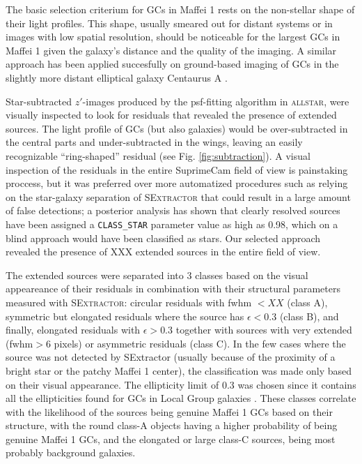 \documentclass[useAMS,usenatbib]{mn2e}
\begin{document}
The basic selection criterium for GCs in Maffei 1 rests on the
non-stellar shape of their light profiles. This shape, usually smeared
out for distant systems or in images with low spatial resolution,
should be noticeable for the largest GCs in Maffei 1 given the
galaxy's distance and the quality of the imaging. A similar approach
has been applied succesfully on ground-based imaging of GCs in the
slightly more distant elliptical galaxy Centaurus A
\citep{rejkuba01,gomez06,gomez07}.

Star-subtracted $z'$-images produced by the psf-fitting algorithm in
\textsc{allstar}, were visually inspected to look for residuals that
revealed the presence of extended sources. The light profile of GCs
(but also galaxies) would be over-subtracted in the central parts and
under-subtracted in the wings, leaving an easily recognizable
``ring-shaped'' residual (see Fig. \ref{fig:subtraction}). A visual
inspection of the residuals in the entire SuprimeCam field of view is
painstaking proccess, but it was preferred over more automatized
procedures such as relying on the star-galaxy separation of
\textsc{SExtractor} that could result in a large amount of false
detections; a posterior analysis has shown that clearly resolved
sources have been assigned a \verb+CLASS_STAR+ parameter value as high
as 0.98, which on a blind approach would have been classified as
stars. Our selected approach revealed the presence of XXX extended
sources in the entire field of view.

The extended sources were separated into 3 classes based on the visual
appeareance of their residuals in combination with their structural
parameters measured with \textsc{SExtractor}: circular residuals with
fwhm $< XX$ (class A), symmetric but elongated residuals where the
source has $\epsilon< 0.3$ (class B), and finally, elongated residuals
with $\epsilon > 0.3$ together with sources with very extended (fwhm$
> 6$ pixels) or asymmetric residuals (class C). In the few cases where
the source was not detected by SExtractor (usually because of the
proximity of a bright star or the patchy Maffei 1 center), the
classification was made only based on their visual appearance. The
ellipticity limit of 0.3 was chosen since it contains all the
ellipticities found for GCs in Local Group galaxies
\citep[e.g.][]{vdb08}. These classes correlate with the likelihood of
the sources being genuine Maffei 1 GCs based on their structure, with
the round class-A objects having a higher probability of being genuine
Maffei 1 GCs, and the elongated or large class-C sources, being most
probably background galaxies.
\end{document}
